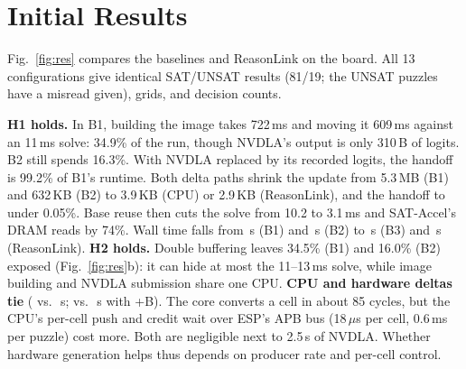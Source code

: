 \documentclass[conference,10pt,letterpaper]{IEEEtran}
\begin{document}
\section{Initial Results}
Fig.~\ref{fig:res} compares the baselines and ReasonLink on the board. All 13 configurations give identical SAT/UNSAT results (81/19; the UNSAT puzzles have a misread given), grids, and decision counts.

\textbf{H1 holds.} In B1, building the image takes 722\,ms and moving it 609\,ms against an 11\,ms solve: 34.9\% of the run, though NVDLA's output is only 310\,B of logits. B2 still spends 16.3\%. With NVDLA replaced by its recorded logits, the handoff is 99.2\% of B1's runtime. Both delta paths shrink the update from 5.3\,MB (B1) and 632\,KB (B2) to 3.9\,KB (CPU) or 2.9\,KB (ReasonLink), and the handoff to under 0.05\%. Base reuse then cuts the solve from 10.2 to 3.1\,ms and SAT-Accel's DRAM reads by 74\%. Wall time falls from \WallFaithful\,s (B1) and \WallLean\,s (B2) to \WallDelta\,s (B3) and \WallRL\,s (ReasonLink).
\textbf{H2 holds.} Double buffering leaves 34.5\% (B1) and 16.0\% (B2) exposed (Fig.~\ref{fig:res}b): it can hide at most the 11--13\,ms solve, while image building and NVDLA submission share one CPU.
\textbf{CPU and hardware deltas tie} (\WallDelta{} vs.\ \WallRL\,s; \WallDeltaB{} vs.\ \WallRLB\,s with +B). The core converts a cell in about 85 cycles, but the CPU's per-cell push and credit wait over ESP's APB bus (18\,$\mu$s per cell, 0.6\,ms per puzzle) cost more. Both are negligible next to 2.5\,s of NVDLA. Whether hardware generation helps thus depends on producer rate and per-cell control.
\end{document}
